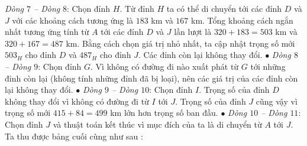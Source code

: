 \begin{multicols}{2}
	\vskip 0.1cm
	\textit{Dòng  $7$ -- Dòng} $8$: Chọn đỉnh $H$. Từ đỉnh $H$ ta có thể di chuyển tới các đỉnh $D$ và $J$ với các khoảng cách tương ứng là $183$ km và $167$ km. Tổng khoảng cách ngắn nhất tương ứng tính từ $A$ tới các đỉnh $D$ và $J$ lần lượt là $320+183=503$ km và $320+167=487$ km. Bằng cách chọn giá trị nhỏ nhất, ta cập nhật trọng số mới $503_H$ cho đỉnh $D$ và $487_H$ cho đỉnh $J$. Các đỉnh còn lại không thay đổi. 
	\vskip 0.1cm
	$\bullet$ \textit{Dòng  $8$ -- Dòng $9$}: Chọn đỉnh $G$. Vì không có đường đi nào xuất phát từ $G$ tới những đỉnh còn lại (không tính những đỉnh đã bị loại), nên các giá trị của các đỉnh còn lại không thay đổi.
	\vskip 0.1cm
	$\bullet$ \textit{Dòng  $9$ -- Dòng $10$}: Chọn đỉnh $I$. Trọng số của đỉnh $D$ không thay đổi vì không có đường đi từ $I$ tới $J$. Trọng số của đỉnh $J$ cũng vậy vì trọng số mới $415+84=499$ km lớn hơn trọng số ban đầu. 
	\vskip 0.1cm
	$\bullet$ \textit{Dòng  $10$ -- Dòng $11$}: Chọn đỉnh $J$ và thuật toán kết thúc vì mục đích của ta là di chuyển từ $A$ tới $J$.
	\vskip 0.1cm 
	Ta thu được bảng cuối cùng như sau :
	\begin{table}[H]
		\vspace*{-5pt}
		\centering
		\captionsetup{labelformat= empty, justification=centering}
\end{table}
\end{multicols}
